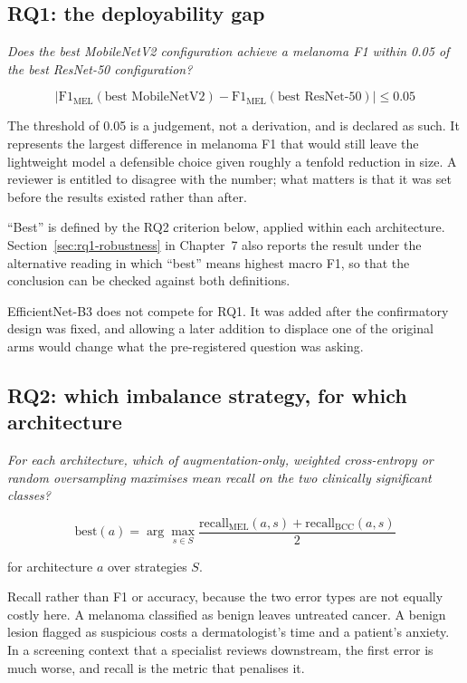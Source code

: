 \subsection*{RQ1: the deployability gap}

\emph{Does the best MobileNetV2 configuration achieve a melanoma F1 within 0.05 of the
best ResNet-50 configuration?}

\begin{equation}
  \bigl| \mathrm{F1}_{\mathrm{MEL}}(\text{best MobileNetV2})
       - \mathrm{F1}_{\mathrm{MEL}}(\text{best ResNet-50}) \bigr| \le 0.05
  \label{eq:rq1}
\end{equation}

The threshold of 0.05 is a judgement, not a derivation, and is declared as such. It
represents the largest difference in melanoma F1 that would still leave the lightweight
model a defensible choice given roughly a tenfold reduction in size. A reviewer is
entitled to disagree with the number; what matters is that it was set before the results
existed rather than after.

``Best'' is defined by the RQ2 criterion below, applied within each architecture.
Section~\ref{sec:rq1-robustness} in Chapter~7 also reports the result under the
alternative reading in which ``best'' means highest macro F1, so that the conclusion can
be checked against both definitions.

EfficientNet-B3 does not compete for RQ1. It was added after the confirmatory design was
fixed, and allowing a later addition to displace one of the original arms would change
what the pre-registered question was asking.

\subsection*{RQ2: which imbalance strategy, for which architecture}

\emph{For each architecture, which of augmentation-only, weighted cross-entropy or
random oversampling maximises mean recall on the two clinically significant classes?}

\begin{equation}
  \text{best}(a) = \arg\max_{s \in S}
    \frac{\mathrm{recall}_{\mathrm{MEL}}(a, s) + \mathrm{recall}_{\mathrm{BCC}}(a, s)}{2}
  \label{eq:rq2}
\end{equation}

for architecture $a$ over strategies $S$.

Recall rather than F1 or accuracy, because the two error types are not equally costly
here. A melanoma classified as benign leaves untreated cancer. A benign lesion flagged
as suspicious costs a dermatologist's time and a patient's anxiety. In a screening
context that a specialist reviews downstream, the first error is much worse, and recall
is the metric that penalises it.


